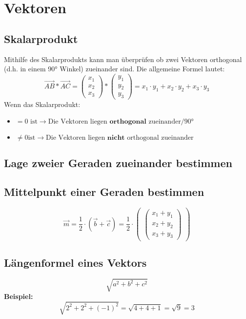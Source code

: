 \section{Vektoren}
	\subsection{Skalarprodukt}
		Mithilfe des Skalarprodukts kann man überprüfen ob zwei Vektoren orthogonal (d.h. in einem 90° Winkel) zueinander sind.	Die allgemeine Formel lautet:
		$$
		\vec{AB} * \vec{AC} = 
		\begin{pmatrix} 
			x_{1} \\
			x_{2} \\
			x_{3} 
		\end{pmatrix}
		* 
		\begin{pmatrix} 
			y_{1} \\
			y_{2} \\
			y_{3}
		\end{pmatrix} = x_{1} \cdot y_{1}+x_{2} \cdot y_{2}+x_{3} \cdot y_{3}
		$$
		Wenn das Skalarprodukt:
			\begin{itemize}
				\item $=0 \text{ ist} \rightarrow \text{Die Vektoren liegen } \textbf{orthogonal } \text{zueinander/90°}$
				\item $\neq 0 \text{ist} \rightarrow \text{Die Vektoren liegen } \textbf{nicht } \text{orthogonal zueinander}$
			\end{itemize}
	\subsection{Lage zweier Geraden zueinander bestimmen}
	\subsection{Mittelpunkt einer Geraden bestimmen}
		$$
\vec{m} = \frac{1}{2}\cdot(\vec{b}+\vec{c})=\frac{1}{2}\cdot
\begin{pmatrix}
\begin{pmatrix} 
x_{1}+y_{1} \\
x_{2}+y_{2} \\
x_{3}+y_{3}
\end{pmatrix}
\end{pmatrix}
$$
	\subsection{Längenformel eines Vektors}
		$$
\sqrt{a^{2}+b^{2}+c^{2}}
$$
		\textbf{Beispiel:}
		$$
\sqrt{2^{2}+2^{2}+(-1)^{2}}=
\sqrt{4+4+1}=
\sqrt{9}=3
$$
